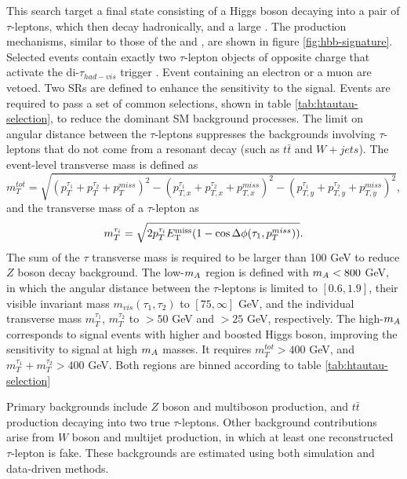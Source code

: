 This search target a final state consisting of a Higgs boson decaying into a pair of $\tau$-leptons, which then decay hadronically, and a large \met \cite{HDBS-2018-50}. The production mechanisms, similar to those of the \monohbb and \monohgamgam, are shown in figure \ref{fig:hbb-signature}. Selected events contain exactly two $\tau$-lepton objects of opposite charge that activate the di-$\tau_{had-vis}$ trigger \cite{ATLAS-CONF-2017-061}. Event containing an electron or a muon are vetoed. Two SRs are defined to enhance the sensitivity to the \thdma signal. Events are required to pass a set of common selections, shown in table \ref{tab:htautau-selection}, to reduce the dominant SM background processes. The limit on angular distance between the $\tau$-leptons suppresses the backgrounds involving $\tau$-leptons that do not come from a resonant decay (such as $t\bar{t}$ and $W+jets$). The event-level transverse mass is defined as 
\begin{equation}
    \label{4.11}
    m_T^{tot} = \sqrt{(p_T^{\tau_1} + p_T^{\tau_2} + p_T^{miss})^2 - (p_{T,x}^{\tau_1} + p_{T,x}^{\tau_2} + p_{T,x}^{miss})^2 - (p_{T,y}^{\tau_1} + p_{T,y}^{\tau_2} + p_{T,y}^{miss})^2},
\end{equation}
and the transverse mass of a $\tau$-lepton as
\begin{equation}
    \label{4.12}
    m_T^{\tau_i} = \sqrt{2p_T^{\tau_i}E_{\mathrm{T}}^{\mathrm{miss}}(1-\cos\Delta\phi(\tau_1, p_T^{miss}))}.
\end{equation}
The sum of the $\tau$ transverse mass is required to be larger than 100 GeV to reduce $Z$ boson decay background. The low-$m_A$ region is defined with $m_A<800$ GeV, in which the angular distance between the $\tau$-leptons is limited to $[0.6,1.9]$, their visible invariant mass $m_{vis}(\tau_1,\tau_2)$ to $[75, \infty]$ GeV, and the individual transverse mass $m_T^{\tau_1}$, $m_T^{\tau_2}$ to $>50$ GeV and $>25$ GeV, respectively. The high-$m_A$ corresponds to signal events with higher \met and boosted Higgs boson, improving the sensitivity to \thdma signal at high $m_A$ masses. It requires $m_T^{tot}>400$ GeV, and $m_T^{\tau_1} + m_T^{\tau_2}>400$ GeV. Both regions are binned according to table \ref{tab:htautau-selection}

Primary backgrounds include $Z$ boson and multiboson production, and $t\bar{t}$ production decaying into two true $\tau$-leptons. Other background contributions arise from $W$ boson and multijet production, in which at least one reconstructed $\tau$-lepton is fake. These backgrounds are estimated using both simulation and data-driven methods. 
 
